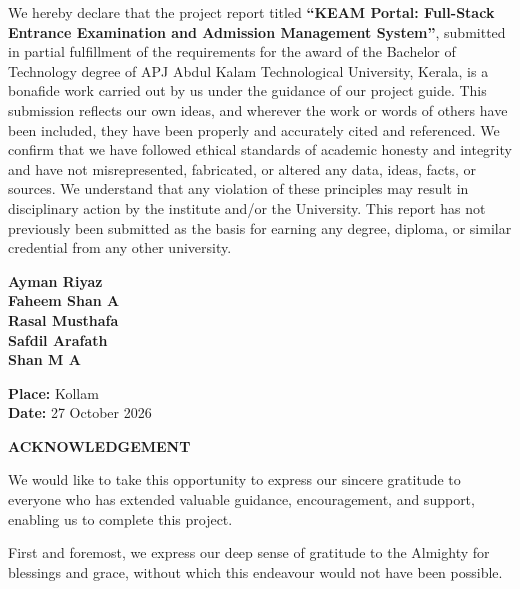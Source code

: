 \documentclass[12pt,a4paper,oneside]{report}
\begin{document}
We hereby declare that the project report titled \textbf{``KEAM Portal: Full-Stack Entrance Examination and Admission Management System''}, submitted in partial fulfillment of the requirements for the award of the Bachelor of Technology degree of APJ Abdul Kalam Technological University, Kerala, is a bonafide work carried out by us under the guidance of our project guide. This submission reflects our own ideas, and wherever the work or words of others have been included, they have been properly and accurately cited and referenced. We confirm that we have followed ethical standards of academic honesty and integrity and have not misrepresented, fabricated, or altered any data, ideas, facts, or sources. We understand that any violation of these principles may result in disciplinary action by the institute and/or the University. This report has not previously been submitted as the basis for earning any degree, diploma, or similar credential from any other university.

\vspace{1.2cm}
\noindent
\begin{minipage}[t]{0.55\textwidth}
\textbf{Ayman Riyaz}\\
\textbf{Faheem Shan A}\\
\textbf{Rasal Musthafa}\\
\textbf{Safdil Arafath}\\
\textbf{Shan M A}
\end{minipage}
\hfill
\begin{minipage}[t]{0.4\textwidth}
\raggedleft
\textbf{Place:} Kollam\\[0.3cm]
\textbf{Date:} 27 October 2026
\end{minipage}

\clearpage
\thispagestyle{plain}
\begin{center}
\vspace*{0.3cm}
{\Large\bfseries ACKNOWLEDGEMENT\par}
\vspace{0.8cm}
\end{center}

We would like to take this opportunity to express our sincere gratitude to everyone who has extended valuable guidance, encouragement, and support, enabling us to complete this project.

First and foremost, we express our deep sense of gratitude to the Almighty for blessings and grace, without which this endeavour would not have been possible.
\end{document}
